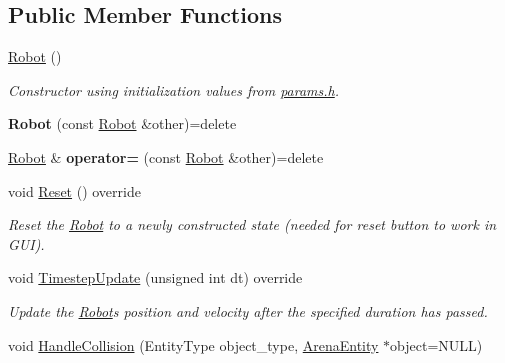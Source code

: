 \subsection*{Public Member Functions}
\begin{DoxyCompactItemize}
\item 
\hyperlink{classRobot_a4fc7c70ae20623f05e06f2ecb388b6c4}{Robot} ()\hypertarget{classRobot_a4fc7c70ae20623f05e06f2ecb388b6c4}{}\label{classRobot_a4fc7c70ae20623f05e06f2ecb388b6c4}

\begin{DoxyCompactList}\small\item\em Constructor using initialization values from \hyperlink{params_8h}{params.\+h}. \end{DoxyCompactList}\item 
{\bfseries Robot} (const \hyperlink{classRobot}{Robot} \&other)=delete\hypertarget{classRobot_adc86f92d8efe83a74c9182b02e0c19d7}{}\label{classRobot_adc86f92d8efe83a74c9182b02e0c19d7}

\item 
\hyperlink{classRobot}{Robot} \& {\bfseries operator=} (const \hyperlink{classRobot}{Robot} \&other)=delete\hypertarget{classRobot_a4c1350316530734165ee6659dfda4b51}{}\label{classRobot_a4c1350316530734165ee6659dfda4b51}

\item 
void \hyperlink{classRobot_af597fd14927d2cd5308ded62f4e54e29}{Reset} () override\hypertarget{classRobot_af597fd14927d2cd5308ded62f4e54e29}{}\label{classRobot_af597fd14927d2cd5308ded62f4e54e29}

\begin{DoxyCompactList}\small\item\em Reset the \hyperlink{classRobot}{Robot} to a newly constructed state (needed for reset button to work in G\+UI). \end{DoxyCompactList}\item 
void \hyperlink{classRobot_ae790462f8782efcfd26082eedec30ed5}{Timestep\+Update} (unsigned int dt) override
\begin{DoxyCompactList}\small\item\em Update the \hyperlink{classRobot}{Robot}\textquotesingle{}s position and velocity after the specified duration has passed. \end{DoxyCompactList}\item 
void \hyperlink{classRobot_a176a9958cc2ea1e585ddb2cdc82c0bdb}{Handle\+Collision} (Entity\+Type object\+\_\+type, \hyperlink{classArenaEntity}{Arena\+Entity} $\ast$object=N\+U\+LL)\hypertarget{classRobot_a176a9958cc2ea1e585ddb2cdc82c0bdb}{}\label{classRobot_a176a9958cc2ea1e585ddb2cdc82c0bdb}


\end{DoxyCompactItemize}
